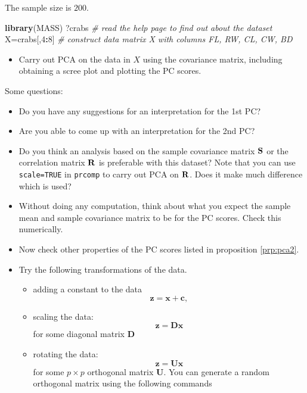 \documentclass[
]{book}
\newenvironment{Shaded}{\begin{snugshade}}{\end{snugshade}}
\newcommand{\CommentTok}[1]{\textcolor[rgb]{0.56,0.35,0.01}{\textit{#1}}}
\newcommand{\DecValTok}[1]{\textcolor[rgb]{0.00,0.00,0.81}{#1}}
\newcommand{\FunctionTok}[1]{\textcolor[rgb]{0.13,0.29,0.53}{\textbf{#1}}}
\newcommand{\NormalTok}[1]{#1}
\newcommand{\OtherTok}[1]{\textcolor[rgb]{0.56,0.35,0.01}{#1}}
\newcommand{\SpecialCharTok}[1]{\textcolor[rgb]{0.81,0.36,0.00}{\textbf{#1}}}
\providecommand{\tightlist}{%
  \setlength{\itemsep}{0pt}\setlength{\parskip}{0pt}}
\theoremstyle{definition}
\theoremstyle{definition}
\theoremstyle{definition}
\theoremstyle{definition}
\theoremstyle{remark}
\begin{document}
The sample size is \(200\).

\begin{Shaded}
\begin{Highlighting}[]
\FunctionTok{library}\NormalTok{(MASS)}
\NormalTok{?crabs }\CommentTok{\# read the help page to find out about the dataset}
\NormalTok{X}\OtherTok{=}\NormalTok{crabs[,}\DecValTok{4}\SpecialCharTok{:}\DecValTok{8}\NormalTok{]     }
\CommentTok{\# construct data matrix X with columns FL, RW, CL, CW, BD}
\end{Highlighting}
\end{Shaded}

\begin{itemize}
\tightlist
\item
  Carry out PCA on the data in \(X\) using the covariance matrix, including obtaining a scree plot and plotting the PC scores.
\end{itemize}

Some questions:

\begin{itemize}
\item
  Do you have any suggestions for an interpretation for the 1st PC?
\item
  Are you able to come up with an interpretation for the 2nd PC?
\item
  Do you think an analysis based on the sample covariance matrix \({\bf S}\) or the
  correlation matrix \({\bf R}\) is preferable with this dataset? Note that you can use \texttt{scale=TRUE} in \texttt{prcomp}
  to carry out PCA on \({\bf R}\). Does it make much difference which is used?
\item
  Without doing any computation, think about what you expect the sample mean and sample covariance matrix to be for the PC scores. Check this numerically.
\item
  Now check other properties of the PC scores listed in proposition \ref{prp:pca2}.
\item
  Try the following transformations of the data.

  \begin{itemize}
  \item
    adding a constant to the data
    \[\mathbf z= \mathbf x+\mathbf c,\]
  \item
    scaling the data:
    \[\mathbf z= \mathbf D\mathbf x\]
    for some diagonal matrix \(\mathbf D\)
  \item
    rotating the data:
    \[\mathbf z= \mathbf U\mathbf x\]
    for some \(p\times p\) orthogonal matrix \(\mathbf U\).
    You can generate a random orthogonal matrix using the following commands
  \end{itemize}
\end{itemize}
\end{document}
